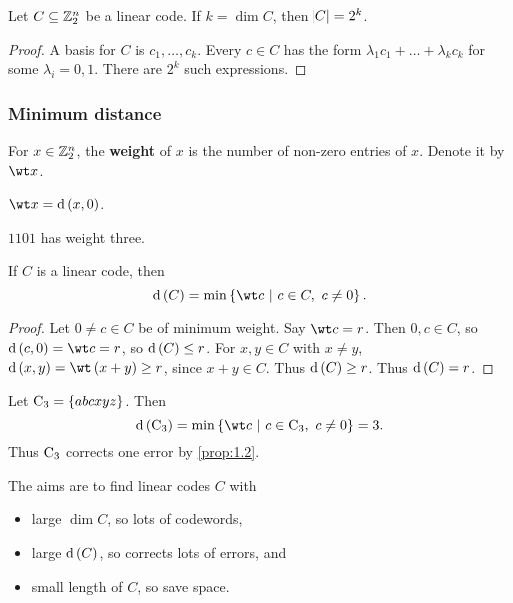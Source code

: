 \begin{proposition}
Let $ C \subseteq \mathbb{Z}_2^n $ be a linear code. If $ k = \dim C $, then $ \abs{C} = 2^k $.
\end{proposition}

\begin{proof}
A basis for $ C $ is $ c_1, \dots, c_k $. Every $ c \in C $ has the form $ \lambda_1c_1 + \dots + \lambda_kc_k $ for some $ \lambda_i = 0, 1 $. There are $ 2^k $ such expressions.
\end{proof}

\subsubsection{Minimum distance}

\begin{definition*}
For $ x \in \mathbb{Z}_2^n $, the \textbf{weight} of $ x $ is the number of non-zero entries of $ x $. Denote it by $ \wt x $.
\end{definition*}

\begin{note*}
$ \wt x = \d\br{x, 0} $.
\end{note*}

\begin{example*}
$ 1101 $ has weight three.
\end{example*}

\begin{proposition}
\label{prop:1.5}
If $ C $ is a linear code, then
$$ \d\br{C} = \min\cbr{\wt c \st c \in C, \ c \ne 0}. $$
\end{proposition}

\begin{proof}
Let $ 0 \ne c \in C $ be of minimum weight. Say $ \wt c = r $. Then $ 0, c \in C $, so $ \d\br{c, 0} = \wt c = r $, so $ \d\br{C} \le r $. For $ x, y \in C $ with $ x \ne y $, $ \d\br{x, y} = \wt \br{x + y} \ge r $, since $ x + y \in C $. Thus $ \d\br{C} \ge r $. Thus $ \d\br{C} = r $.
\end{proof}

\begin{example*}
Let $ \C_3 = \cbr{abcxyz} $. Then
$$ \d\br{\C_3} = \min\cbr{\wt c \st c \in \C_3, \ c \ne 0} = 3. $$
Thus $ \mathrm{C}_3 $ corrects one error by \ref{prop:1.2}.
\end{example*}

The aims are to find linear codes $ C $ with
\begin{itemize}
\item large $ \dim C $, so lots of codewords,
\item large $ \d\br{C} $, so corrects lots of errors, and
\item small length of $ C $, so save space.
\end{itemize}

